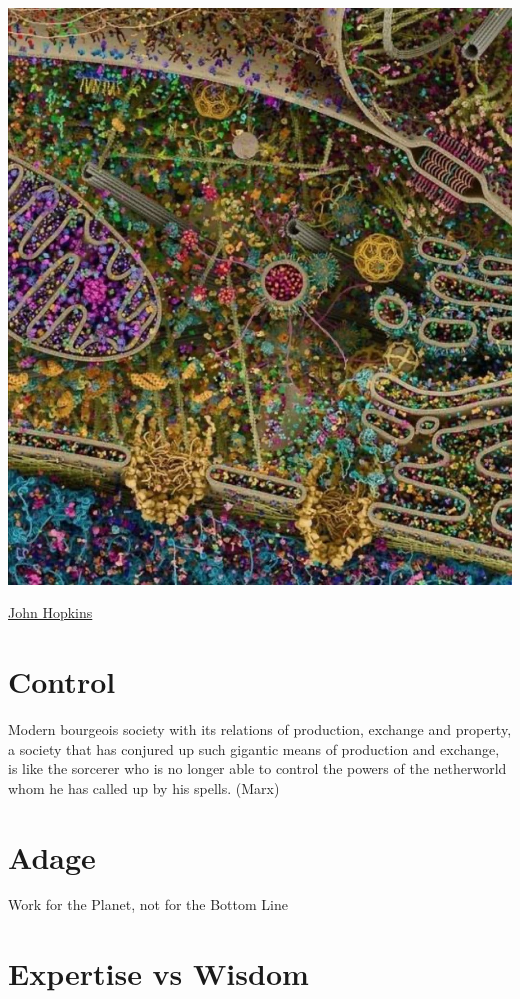 \documentclass[
]{book}
\begin{document}
\includegraphics{fig/Human_Cell.jpeg}

\href{https://www.hopkinsmedicine.org/news/articles/image-of-the-month-the-jewelry-box-of-life}{John Hopkins}

\hypertarget{control}{%
\chapter{Control}\label{control}}

Modern bourgeois society with its relations of production, exchange and property,
a society that has conjured up such gigantic means of production and exchange,
is like the sorcerer who is no longer able to control
the powers of the netherworld whom he has called up by his spells. (Marx)

\hypertarget{adage}{%
\chapter{Adage}\label{adage}}

Work for the Planet, not for the Bottom Line

\hypertarget{expertise-vs-wisdom}{%
\chapter{Expertise vs Wisdom}\label{expertise-vs-wisdom}}
\end{document}
